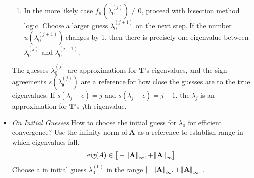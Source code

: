 \documentclass[11pt, a4paper]{article}
\newcommand{\mat}[1]{\mathbf{#1}} %
\begin{document}
\begin{itemize}
\begin{enumerate}
		\item In the more likely case $ f_{n}(\lambda^{(j)}_0) \neq 0 $, proceed with bisection method logic. Choose a larger guess $ \lambda_0^{(j+1)} $ on the next step. If the number $ u(\lambda_0^{(j+1)}) $ changes by 1, then there is precisely one eigenvalue between $ \lambda_0^{(j)} $ and $ \lambda_0^{(j+1)} $. 
	\end{enumerate}
	The guesses $ \lambda^{(j)}_0 $ are approximations for $ \mat{T} $'s eigenvalues, and the sign agreements $ s( \lambda^{(j)}_0) $ are a reference for how close the guesses are to the true eigenvalues. If $ s( \lambda_{j} - \epsilon) = j $ and $ s( \lambda_{j} + \epsilon) = j -1 $, the $ \lambda_{j} $ is an approximation for $ \mat{T} $'s $ j $th eigenvalue.
	
	\item \textit{On Initial Guesses} How to choose the initial guess for $ \lambda_0 $ for efficient convergence? Use the infinity norm of $ \mat{A} $ as a reference to establish range in which eigenvalues fall.
	\begin{equation*}
		\operatorname{eig}(A) \in \big [-\norm{\mat{A}}_{\infty}, + \norm{\mat{A}}_{\infty}\big ]
	\end{equation*}
	Choose a in initial guess $ \lambda_{0}^{(0)} $ in the range  $ [-\norm{\mat{A}}_{\infty}, + \norm{\mat{A}}_{\infty}\big ] $.

\end{itemize}
\end{document}
